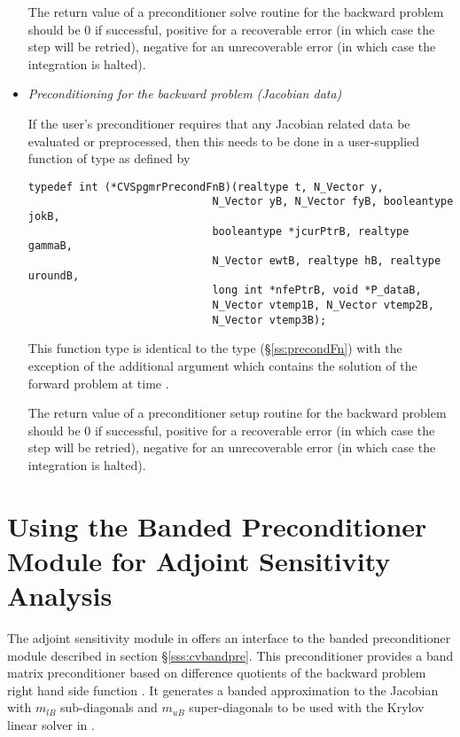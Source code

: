 \begin{itemize}
  The return value of a preconditioner solve routine for the backward
  problem should be $0$ if successful, 
  positive for a recoverable error (in which case the step will be retried),     
  negative for an unrecoverable error (in which case the integration is halted).

\item {\em Preconditioning for the backward problem
    (Jacobian data)}

  If the user's preconditioner requires that any Jacobian related data
  be evaluated or preprocessed, then this needs to be done in a
  user-supplied {\C} function of type  
  as defined by
\begin{verbatim}
typedef int (*CVSpgmrPrecondFnB)(realtype t, N_Vector y, 
                             N_Vector yB, N_Vector fyB, booleantype jokB, 
                             booleantype *jcurPtrB, realtype gammaB,
                             N_Vector ewtB, realtype hB, realtype uroundB,
                             long int *nfePtrB, void *P_dataB,
                             N_Vector vtemp1B, N_Vector vtemp2B,
                             N_Vector vtemp3B);
\end{verbatim}
  This function type is identical to the type 
  (\S\ref{ss:precondFn}) with the exception
  of the additional argument  which contains the solution of the 
  forward problem at time .

  The return value of a preconditioner setup routine for the backward
  problem should be $0$ if successful, 
  positive for a recoverable error (in which case the step will be retried),     
  negative for an unrecoverable error (in which case the integration is halted).

\end{itemize}

\section{Using the Banded Preconditioner Module for Adjoint Sensitivity Analysis}

The adjoint sensitivity module in {\cvodes} offers an interface to the banded 
preconditioner module {\cvbandpre} described in section \S\ref{sss:cvbandpre}.
This preconditioner provides a band matrix preconditioner based on difference
quotients of the backward problem right hand side function . It generates
a banded approximation to the Jacobian with $m_{lB}$ sub-diagonals and $m_{uB}$
super-diagonals to be used with the Krylov linear solver in {\cvspgmr}.


